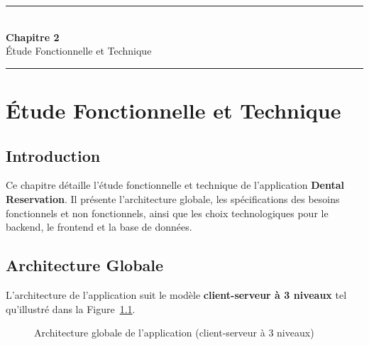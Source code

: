 
\clearpage
\thispagestyle{chaptertitlepage}
\vspace*{\fill}
\begin{center}
\rule{\textwidth}{0.4pt}\\[0.8cm]
{\fontsize{24}{29}\selectfont\bfseries Chapitre 2}\\[0.6cm]
{\fontsize{18}{22}\selectfont Étude Fonctionnelle et Technique}\\[0.8cm]
\rule{\textwidth}{0.4pt}
\end{center}
\vspace*{\fill}
\clearpage

\chapter{Étude Fonctionnelle et Technique}

\section{Introduction}

Ce chapitre détaille l'étude fonctionnelle et technique de l'application \textbf{Dental Reservation}. Il présente l'architecture globale, les spécifications des besoins fonctionnels et non fonctionnels, ainsi que les choix technologiques pour le backend, le frontend et la base de données.

\section{Architecture Globale}

L'architecture de l'application suit le modèle \textbf{client-serveur à 3 niveaux} tel qu'illustré dans la Figure~\ref{fig:architecture}.

\begin{figure}[H]
\centering
{}
\caption{Architecture globale de l'application (client-serveur à 3 niveaux)}
\label{fig:architecture}
\end{figure}

